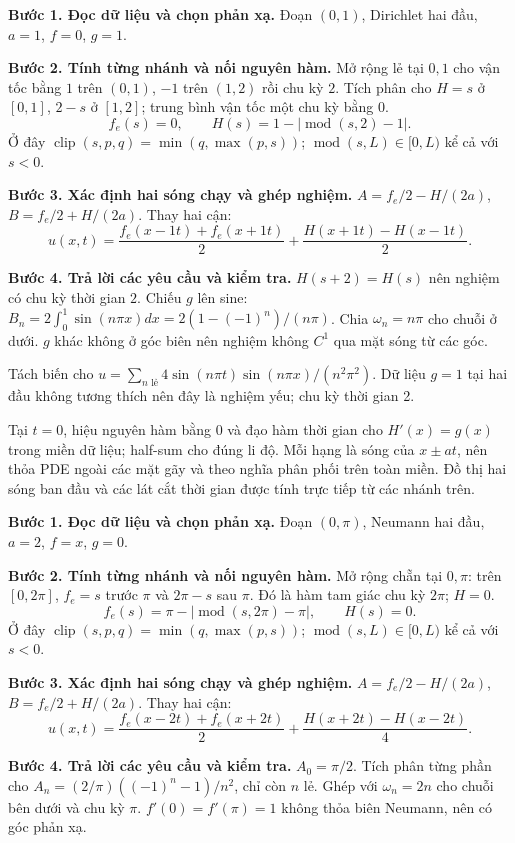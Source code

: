 \textbf{Bước 1. Đọc dữ liệu và chọn phản xạ.} Đoạn $(0,1)$, Dirichlet hai đầu, $a=1$, $f=0$, $g=1$.

\textbf{Bước 2. Tính từng nhánh và nối nguyên hàm.} Mở rộng lẻ tại $0,1$ cho vận tốc bằng $1$ trên $(0,1)$, $-1$ trên $(1,2)$ rồi chu kỳ $2$. Tích phân cho $H=s$ ở $[0,1]$, $2-s$ ở $[1,2]$; trung bình vận tốc một chu kỳ bằng $0$.
\[f_e(s)=0,\qquad H(s)=1-|\operatorname{mod}(s,2)-1|.\]
Ở đây $\operatorname{clip}(s,p,q)=\min(q,\max(p,s))$; $\operatorname{mod}(s,L)\in[0,L)$ kể cả với $s<0$.

\textbf{Bước 3. Xác định hai sóng chạy và ghép nghiệm.} $A=f_e/2-H/(2a)$, $B=f_e/2+H/(2a)$. Thay hai cận:
\[u(x,t)=\frac{f_e(x-1t)+f_e(x+1t)}2+\frac{H(x+1t)-H(x-1t)}{2}.\]

\textbf{Bước 4. Trả lời các yêu cầu và kiểm tra.} $H(s+2)=H(s)$ nên nghiệm có chu kỳ thời gian $2$. Chiếu $g$ lên sine: $B_n=2\int_0^1\sin(n\pi x)dx=2(1-(-1)^n)/(n\pi)$. Chia $\omega_n=n\pi$ cho chuỗi ở dưới. $g$ khác không ở góc biên nên nghiệm không $C^1$ qua mặt sóng từ các góc.

Tách biến cho $u=\sum_{n\text{ lẻ}}4\sin(n\pi t)\sin(n\pi x)/(n^2\pi^2)$. Dữ liệu $g=1$ tại hai đầu không tương thích nên đây là nghiệm yếu; chu kỳ thời gian 2.

Tại $t=0$, hiệu nguyên hàm bằng $0$ và đạo hàm thời gian cho $H'(x)=g(x)$ trong miền dữ liệu; half-sum cho đúng li độ. Mỗi hạng là sóng của $x\pm at$, nên thỏa PDE ngoài các mặt gãy và theo nghĩa phân phối trên toàn miền. Đồ thị hai sóng ban đầu và các lát cắt thời gian được tính trực tiếp từ các nhánh trên.

\textbf{Bước 1. Đọc dữ liệu và chọn phản xạ.} Đoạn $(0,\pi)$, Neumann hai đầu, $a=2$, $f=x$, $g=0$.

\textbf{Bước 2. Tính từng nhánh và nối nguyên hàm.} Mở rộng chẵn tại $0,\pi$: trên $[0,2\pi]$, $f_e=s$ trước $\pi$ và $2\pi-s$ sau $\pi$. Đó là hàm tam giác chu kỳ $2\pi$; $H=0$.
\[f_e(s)=\pi-|\operatorname{mod}(s,2\pi)-\pi|,\qquad H(s)=0.\]
Ở đây $\operatorname{clip}(s,p,q)=\min(q,\max(p,s))$; $\operatorname{mod}(s,L)\in[0,L)$ kể cả với $s<0$.

\textbf{Bước 3. Xác định hai sóng chạy và ghép nghiệm.} $A=f_e/2-H/(2a)$, $B=f_e/2+H/(2a)$. Thay hai cận:
\[u(x,t)=\frac{f_e(x-2t)+f_e(x+2t)}2+\frac{H(x+2t)-H(x-2t)}{4}.\]

\textbf{Bước 4. Trả lời các yêu cầu và kiểm tra.} $A_0=\pi/2$. Tích phân từng phần cho $A_n=(2/\pi)((-1)^n-1)/n^2$, chỉ còn $n$ lẻ. Ghép với $\omega_n=2n$ cho chuỗi bên dưới và chu kỳ $\pi$. $f'(0)=f'(\pi)=1$ không thỏa biên Neumann, nên có góc phản xạ.

